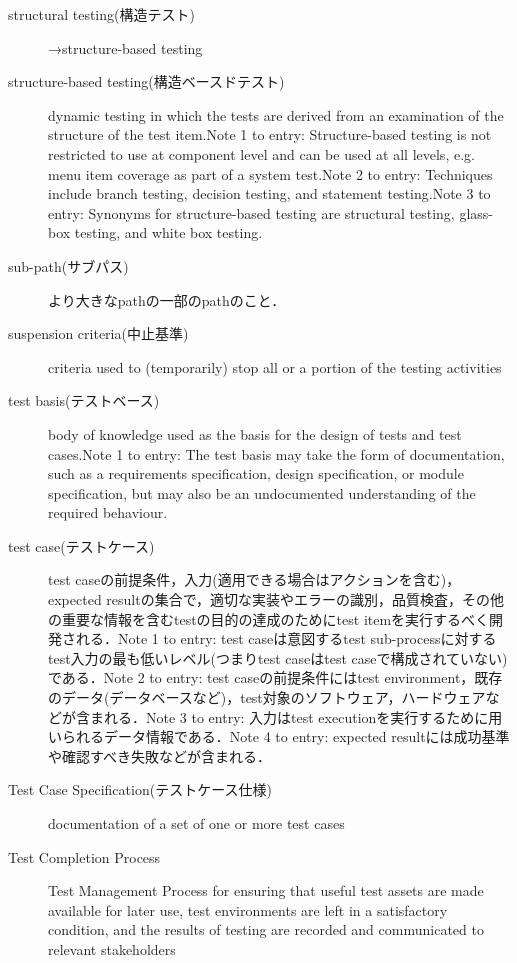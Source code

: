 \begin{description}
    \item[structural testing(構造テスト)]→structure-based testing
    \item[structure-based testing(構造ベースドテスト)]dynamic testing in which the tests are derived from an examination of the structure of the test item.Note 1 to entry: Structure-based testing is not restricted to use at component level and can be used at all levels, e.g. menu item coverage as part of a system test.Note 2 to entry: Techniques include branch testing, decision testing, and statement testing.Note 3 to entry: Synonyms for structure-based testing are structural testing, glass-box testing, and white box testing.
    \item[sub-path(サブパス)]より大きなpathの一部のpathのこと．
    \item[suspension criteria(中止基準)]criteria used to (temporarily) stop all or a portion of the testing activities
    \item[test basis(テストベース)]body of knowledge used as the basis for the design of tests and test cases.Note 1 to entry: The test basis may take the form of documentation, such as a requirements specification, design specification, or module specification, but may also be an undocumented understanding of the required behaviour.
    \item[test case(テストケース)]test caseの前提条件，入力(適用できる場合はアクションを含む)，expected resultの集合で，適切な実装やエラーの識別，品質検査，その他の重要な情報を含むtestの目的の達成のためにtest itemを実行するべく開発される．Note 1 to entry: test caseは意図するtest sub-processに対するtest入力の最も低いレベル(つまりtest caseはtest caseで構成されていない)である．Note 2 to entry: test caseの前提条件にはtest environment，既存のデータ(データベースなど)，test対象のソフトウェア，ハードウェアなどが含まれる．Note 3 to entry: 入力はtest executionを実行するために用いられるデータ情報である．Note 4 to entry: expected resultには成功基準や確認すべき失敗などが含まれる．
    \item[Test Case Specification(テストケース仕様)]documentation of a set of one or more test cases
    \item[Test Completion Process]Test Management Process for ensuring that useful test assets are made available for later use, test environments are left in a satisfactory condition, and the results of testing are recorded and communicated to relevant stakeholders

\end{description}
